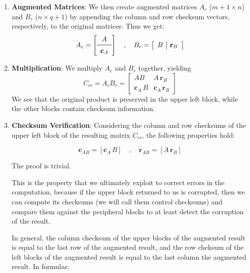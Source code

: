 \begin{enumerate}
  \item \textbf{Augmented Matrices}:
    We then create augmented matrices $A_{c}$ (\( m+1 \times n \)) and $B_{r}$ (\( n \times q+1 \))
    by appending the column and row checksum vectors, respectively, to the original matrices:
    Thus we get:
    \[
      A_{c} =
      \left[
        \begin{array}{c}
          A \\
          \midrule
          \mathbf{c}_A
        \end{array}
      \right]
      \quad
      ,
      \quad
      B_{r} = \left[
        \begin{array}{c|c}
          B &
          \mathbf{r}_B
        \end{array}
      \right]
    \]
  \item \textbf{Multiplication}: We multiply $ A_{c} $ and $ B_{r} $ together, yielding
    \[
      C_{cr} = A_{c} B_{r} = \left[
        \begin{array}{c|c}
          A B & A \, \mathbf{r}_B \\
          \hline
          \mathbf{c}_A \, B & \mathbf{c}_A \, \mathbf{r}_B
        \end{array}
      \right]
    \]
    We see that the original product is preserved
    in the upper left block,
    while the other blocks contain checksum information.

  \item \textbf{Checksum Verification}:
    Considering the column and row checksums of the upper left block of
    the resulting matrix \( C_{cr} \), the following properties hold:

    \[
      \mathbf{c}_{AB} = \left[\mathbf{c}_A \, B \right]
      \quad
      ,
      \quad
      \mathbf{r}_{AB} = \left[A \, \mathbf{r}_B \right]
    \]

    The proof is trivial.

    This is the property that we ultimately exploit to correct errors in the computation,
    because if the upper block returned to us is corrupted,
    then we can compute its checksums (we will call them control checksums)
    and compare them against the peripheral blocks to at least detect the corruption of the result.

    In general, the column checksum of the upper blocks of the augmented result
    is equal to the last row of the augmented result, and the row cheksum of the left blocks of the augmented result
    is equal to the last column the augmented result. In formulas:


\end{enumerate}
